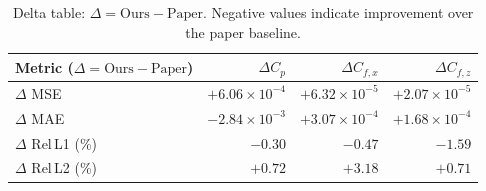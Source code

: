 \documentclass[11pt]{article}
\newcommand{\better}[1]{\textcolor{better}{\textbf{#1}}}
\newcommand{\worse}[1]{\textcolor{worse}{#1}}
\begin{document}
\begin{table}[ht]
\centering
\caption{%
  Delta table: $\Delta = \text{Ours} - \text{Paper}$.
  Negative values indicate improvement over the paper baseline.
}
\label{tab:delta}
\setlength{\tabcolsep}{9pt}
\renewcommand{\arraystretch}{1.3}
\begin{tabular}{lrrr}
\toprule
\textbf{Metric} ($\Delta = \text{Ours} - \text{Paper}$)
  & \textbf{$\Delta C_p$}
  & \textbf{$\Delta C_{f,x}$}
  & \textbf{$\Delta C_{f,z}$} \\
\midrule
$\Delta$ MSE
  & \worse{$+6.06 \times 10^{-4}$}
  & \worse{$+6.32 \times 10^{-5}$}
  & \worse{$+2.07 \times 10^{-5}$} \\
$\Delta$ MAE
  & \better{$-2.84 \times 10^{-3}$}
  & \worse{$+3.07 \times 10^{-4}$}
  & \worse{$+1.68 \times 10^{-4}$} \\
$\Delta$ Rel\,L1 (\%)
  & \better{$-0.30$}
  & \better{$-0.47$}
  & \better{$-1.59$} \\
$\Delta$ Rel\,L2 (\%)
  & \worse{$+0.72$}
  & \worse{$+3.18$}
  & \worse{$+0.71$} \\
\bottomrule
\end{tabular}
\end{table}
\end{document}
